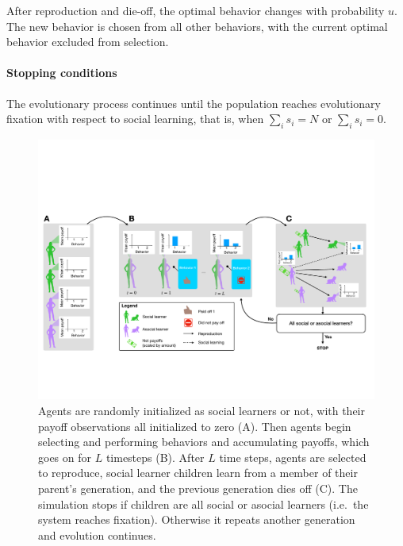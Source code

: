 \documentclass[letterpaper,11.5pt]{scrartcl}
\newcommand{\cm}[1]{{\textcolor{mypurple} {({\tiny CM:} #1)}}}
\begin{document}
After reproduction and die-off, the optimal behavior changes with probability
$u$. The new behavior is chosen from all other behaviors, with the 
current optimal behavior excluded from selection.

\paragraph{Stopping conditions} The evolutionary process continues until the
population reaches evolutionary fixation with respect to social learning, that is, when
$\sum_i s_i = N$ or $\sum_i s_i = 0$. 

\clearpage

\begin{figure}
  \caption{Agents are randomly initialized as social learners or not, with their
  payoff observations all initialized to zero (A). Then agents begin selecting
and performing behaviors and accumulating payoffs, which goes on for $L$
timesteps (B). After $L$ time steps, agents are selected to reproduce,
social learner children learn from a member of their parent's generation, and
the previous generation dies off (C). The simulation stops if children are all
social or asocial learners (i.e.\ the system reaches fixation).
Otherwise it repeats another generation and evolution continues.} 
  \label{fig:schematic}
  \centering
    \includegraphics[width=\textwidth]{Figures/IntraInterGenerationalDynamics.pdf}
\end{figure}
\end{document}

